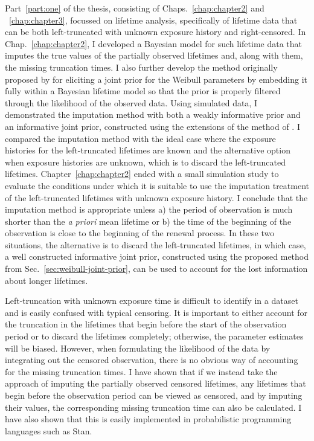 Part~\ref{part:one} of the thesis, consisting of Chaps.~\ref{chap:chapter2} and ~\ref{chap:chapter3}, focussed on lifetime analysis, specifically of lifetime data that can be both left-truncated with unknown exposure history and right-censored. In Chap.~\ref{chap:chapter2}, I developed a Bayesian model for such lifetime data that imputes the true values of the partially observed lifetimes and, along with them, the missing truncation times. I also further develop the method originally proposed by \citet{kaminskiy2005} for eliciting a joint prior for the Weibull parameters by embedding it fully within a Bayesian lifetime model so that the prior is properly filtered through the likelihood of the observed data. Using simulated data, I demonstrated the imputation method with both a weakly informative prior and an informative joint prior, constructed using the extensions of the method of \citet{kaminskiy2005}. I compared the imputation method with the ideal case where the exposure histories for the left-truncated lifetimes are known and the alternative option when exposure histories are unknown, which is to discard the left-truncated lifetimes. Chapter~\ref{chap:chapter2} ended with a small simulation study to evaluate the conditions under which it is suitable to use the imputation treatment of the left-truncated lifetimes with unknown exposure history. I conclude that the imputation method is appropriate unless a) the period of observation is much shorter than the \textit{a priori} mean lifetime or b) the time of the beginning of the observation is close to the beginning of the renewal process. In these two situations, the alternative is to discard the left-truncated lifetimes, in which case, a well constructed informative joint prior, constructed using the proposed method from Sec.~\ref{sec:weibull-joint-prior}, can be used to account for the lost information about longer lifetimes.

Left-truncation with unknown exposure time is difficult to identify in a dataset and is easily confused with typical censoring. It is important to either account for the truncation in the lifetimes that begin before the start of the observation period or to discard the lifetimes completely; otherwise, the parameter estimates will be biased. However, when formulating the likelihood of the data by integrating out the censored observation, there is no obvious way of accounting for the missing truncation times. I have shown that if we instead take the approach of imputing the partially observed censored lifetimes, any lifetimes that begin before the observation period can be viewed as censored, and by imputing their values, the corresponding missing truncation time can also be calculated. I have also shown that this is easily implemented in probabilistic programming languages such as Stan.


